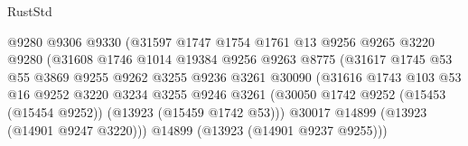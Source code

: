 \begin{lexlean}{RustStd}
\begin{coremodule}
                                      @9280
                                      @9306
                                      @9330
                                      (@31597
                                        @1747
                                        @1754
                                        @1761
                                        @13
                                        @9256
                                        @9265
                                        @3220
                                        @9280
                                        (@31608
                                          @1746
                                          @1014
                                          @19384
                                          @9256
                                          @9263
                                          @8775
                                          (@31617
                                            @1745
                                            @53
                                            @55
                                            @3869
                                            @9255
                                            @9262
                                            @3255
                                            @9236
                                            @3261
                                            @30090
                                            (@31616
                                              @1743
                                              @103
                                              @53
                                              @16
                                              @9252
                                              @3220
                                              @3234
                                              @3255
                                              @9246
                                              @3261
                                              (@30050
                                                @1742
                                                @9252
                                                (@15453 (@15454 @9252))
                                                (@13923 (@15459 @1742 @53)))
                                              @30017
                                              @14899
                                              (@13923 (@14901 @9247 @3220)))
                                            @14899
                                            (@13923 (@14901 @9237 @9255)))

\end{coremodule}
\end{lexlean}

